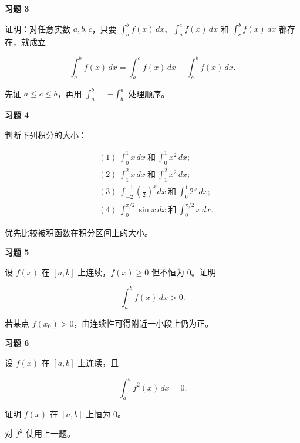 \begin{exercisebox}
\textbf{习题 3 }

证明：对任意实数 \(a,b,c\)，只要 \(\int_a^b f(x)\,dx\)、\(\int_a^c f(x)\,dx\) 和 \(\int_c^b f(x)\,dx\) 都存在，就成立

\[
        \int_a^b f(x)\,dx
        =
        \int_a^c f(x)\,dx+\int_c^b f(x)\,dx.
      \]

\begin{hintbox}
先证 \(a\le c\le b\)，再用 \(\int_a^b=-\int_b^a\) 处理顺序。
\end{hintbox}
\end{exercisebox}

\begin{exercisebox}
\textbf{习题 4 }

判断下列积分的大小：

\[
      \begin{aligned}
      &(1)\ \int_0^1 x\,dx\ \text{和}\ \int_0^1 x^2\,dx;\\
      &(2)\ \int_1^2 x\,dx\ \text{和}\ \int_1^2 x^2\,dx;\\
      &(3)\ \int_{-2}^{-1}\left(\frac12\right)^x dx\ \text{和}\ \int_0^1 2^x\,dx;\\
      &(4)\ \int_0^{\pi/2}\sin x\,dx\ \text{和}\ \int_0^{\pi/2}x\,dx.
      \end{aligned}
      \]

\begin{hintbox}
优先比较被积函数在积分区间上的大小。
\end{hintbox}
\end{exercisebox}

\begin{exercisebox}
\textbf{习题 5 }

设 \(f(x)\) 在 \([a,b]\) 上连续，\(f(x)\ge0\) 但不恒为 \(0\)。证明

\[
        \int_a^b f(x)\,dx>0.
      \]

\begin{hintbox}
若某点 \(f(x_0)>0\)，由连续性可得附近一小段上仍为正。
\end{hintbox}
\end{exercisebox}

\begin{exercisebox}
\textbf{习题 6 }

设 \(f(x)\) 在 \([a,b]\) 上连续，且

\[
        \int_a^b f^2(x)\,dx=0.
      \]

证明 \(f(x)\) 在 \([a,b]\) 上恒为 \(0\)。

\begin{hintbox}
对 \(f^2\) 使用上一题。
\end{hintbox}
\end{exercisebox}

